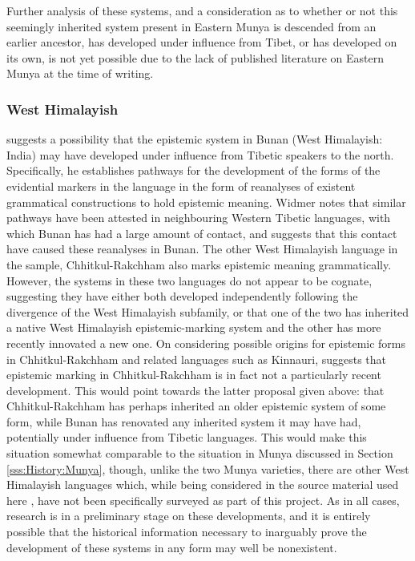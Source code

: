 Further analysis of these systems, and a consideration as to whether or not this seemingly inherited system present in Eastern Munya is descended from an earlier ancestor, has developed under influence from Tibet, or has developed on its own, is not yet possible due to the lack of published literature on Eastern Munya at the time of writing.

\subsubsection{West Himalayish}
 suggests a possibility that the epistemic system in Bunan (West Himalayish: India) may have developed under influence from Tibetic speakers to the north. Specifically, he establishes pathways for the development of the forms of the evidential markers in the language in the form of reanalyses of existent grammatical constructions to hold epistemic meaning. Widmer notes that similar pathways have been attested in neighbouring Western Tibetic languages, with which Bunan has had a large amount of contact, and suggests that this contact have caused these reanalyses in Bunan. The other West Himalayish language in the sample, Chhitkul-Rakchham \cite[West Himalayish: India,][]{Martinez2021} also marks epistemic meaning grammatically. However, the systems in these two languages do not appear to be cognate, suggesting they have either both developed independently following the divergence of the West Himalayish subfamily, or that one of the two has inherited a native West Himalayish epistemic-marking system and the other has more recently innovated a new one. On considering possible origins for epistemic forms in Chhitkul-Rakchham and related languages such as Kinnauri,  suggests that epistemic marking in Chhitkul-Rakchham is in fact not a particularly recent development. This would point towards the latter proposal given above: that Chhitkul-Rakchham has perhaps inherited an older epistemic system of some form, while Bunan has renovated any inherited system it may have had, potentially under influence from Tibetic languages. This would make this situation somewhat comparable to the situation in Munya discussed in Section \ref{sss:History:Munya}, though, unlike the two Munya varieties, there are other West Himalayish languages which, while being considered in the source material used here \cites{Widmer2014}{Widmer2017}{Martinez2021}, have not been specifically surveyed as part of this project. As in all cases, research is in a preliminary stage on these developments, and it is entirely possible that the historical information necessary to inarguably prove the development of these systems in any form may well be nonexistent.

